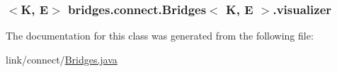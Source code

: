 \subsubsection[{visualizer}]{$<$K, E$>$ {\bf bridges.\+connect.\+Bridges}$<$ K, E $>$.visualizer\hspace{0.3cm}{\ttfamily [protected]}}\label{classbridges_1_1connect_1_1_bridges_af3fc35779b31c976ed8bf2e173310502}


The documentation for this class was generated from the following file\+:\begin{DoxyCompactItemize}
\item 
link/connect/\hyperlink{_bridges_8java}{Bridges.\+java}\end{DoxyCompactItemize}
